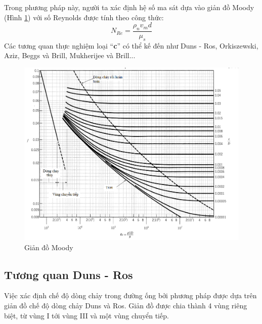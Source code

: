 \documentclass[12pt,a4paper]{report}
\begin{document}
Trong phương pháp này, người ta xác định hệ số ma sát dựa vào giản đồ Moody (Hình \ref{fig:Moody_diagram}) với số Reynolds được tính theo công thức:
	\begin{equation}
	N_{Re} = \dfrac{\rho_{n}v_{m}d}{\mu_s}
	\end{equation}
Các tương quan thực nghiệm loại “\textbf{c}” có thể kế đến như Duns - Ros, Orkiszewski, Aziz, Beggs và Brill, Mukherijee và Brill...
	\begin{figure}[h]
		\centering
		\includegraphics[scale=0.6]{Fig/Moody_diagram.png}
		\caption[Giản đồ Moody]{Giản đồ Moody \cite{brill1999multiphase}}
		\label{fig:Moody_diagram}
	\end{figure}

\subsection{Tương quan Duns - Ros}

Việc xác định chế độ dòng chảy trong đường ống bởi phương pháp được dựa trên giản đồ chế độ dòng chảy Duns và Ros. Giản đồ được chia thành 4 vùng riêng biệt, từ vùng I tới vùng III và một vùng chuyển tiếp.
\end{document}
